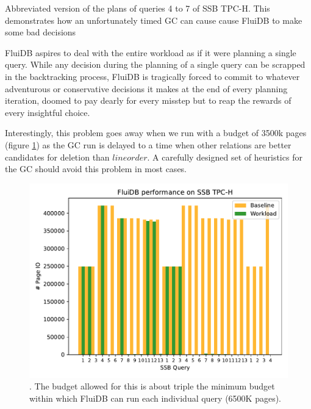 \begin{code}
\begin{verbatim}
\end{verbatim}
  \caption{\label{fig:reverse_operations}Abbreviated version of the
    plans of queries 4 to 7 of SSB TPC-H. This demonstrates how an
    unfortunately timed GC can cause cause FluiDB to make some bad decisions}

\end{code}

FluiDB aspires to deal with the entire workload as if it were planning
a single query. While any decision during the planning of a single
query can be scrapped in the backtracking process, FluiDB is
tragically forced to commit to whatever adventurous or conservative
decisions it makes at the end of every planning iteration, doomed to
pay dearly for every misstep but to reap the rewards of every
insightful choice.

Interestingly, this problem goes away when we run with a budget of
3500k pages (figure \ref{fig:extra_large_budget_plot}) as the GC run
is delayed to a time when other relations are better candidates for
deletion than \(\mathit{lineorder}\). A carefully designed set of
heuristics for the GC should avoid this problem in most cases.

\begin{figure}[p]
\centering
\includegraphics[width=.9\linewidth]{./plans/io_perf_65000.pdf}

\caption{\label{fig:extra_large_budget_plot}
\ioperfdescr. The budget
  allowed for this is about triple the minimum budget within which
  FluiDB can run each individual query (6500K pages).}
\end{figure}

